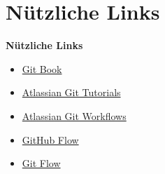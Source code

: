     \section{Nützliche Links}\label{sec:links}
    \begin{frame}[c]
        \slidehead
        \vspace{-1em}
        \centering
        \large
        \textbf{Nützliche Links}
        \vspace{1em}
        \begin{itemize}
            [<+->]
            \item \href{https://git-scm.com/book/en/v2}{Git Book}
            \item \href{https://www.atlassian.com/de/git/tutorials}{Atlassian Git Tutorials}
            \item \href{https://www.atlassian.com/de/git/tutorials/comparing-workflows}{Atlassian Git Workflows}
            \item \href{https://docs.github.com/en/get-started/quickstart/github-flow}{GitHub Flow}
            \item \href{https://nvie.com/posts/a-successful-git-branching-model/}{Git Flow}
        \end{itemize}
    \end{frame}

